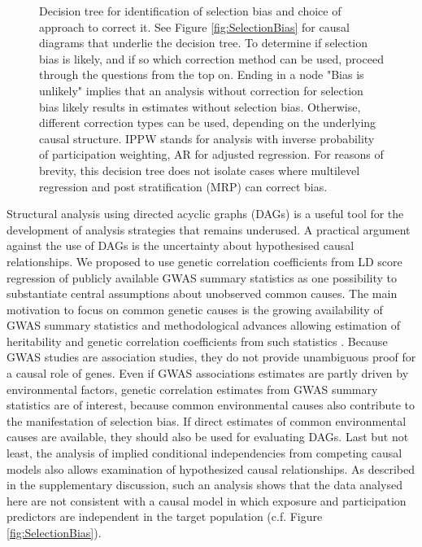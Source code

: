 \documentclass[12pt]{article}
\begin{document}
\begin{figure}
	\centering
	\begin{singlespace}
    \end{singlespace}
	
	\caption{Decision tree for identification of selection bias and choice of approach to correct it. See Figure \ref{fig:SelectionBias} for causal diagrams that underlie the decision tree. 
	To determine if selection bias is likely, and if so which correction method can be used, proceed through the questions from the top on. Ending in a node "Bias is unlikely" implies that an analysis without correction for selection bias likely results in estimates without selection bias. Otherwise, different correction types can be used, depending on the underlying causal structure. IPPW stands for analysis with inverse probability of participation weighting, AR for adjusted regression. For reasons of brevity, this decision tree does not isolate cases where multilevel regression and post stratification (MRP) can correct bias.}
	\label{fig:DecisionTree}
\end{figure}


Structural analysis using directed acyclic graphs (DAGs) is a useful tool for the development of analysis strategies that remains underused. A practical argument against the use of DAGs is the uncertainty about hypothesised causal relationships. We proposed to use genetic correlation coefficients from LD score regression of publicly available GWAS summary statistics as one possibility to substantiate central assumptions about unobserved common causes. The main motivation to focus on common genetic causes is the growing availability of GWAS summary statistics and methodological advances allowing estimation of heritability and genetic correlation coefficients from such statistics \cite{Bulik-Sullivan2015-er, Bulik-Sullivan2015-xn}. Because GWAS studies are association studies, they do not provide unambiguous proof for a causal role of genes. Even if GWAS associations estimates are partly driven by environmental factors, genetic correlation estimates from GWAS summary statistics are of interest, because common environmental causes also contribute to the manifestation of selection bias. If direct estimates of common environmental causes are available, they should also be used for evaluating DAGs. Last but not least, the analysis of implied conditional independencies from competing causal models also allows examination of hypothesized causal relationships. As described in the supplementary discussion, such an analysis shows that the data analysed here are not consistent with a causal model in which exposure and participation predictors are independent in the target population (c.f. Figure \ref{fig:SelectionBias}).
\end{document}

